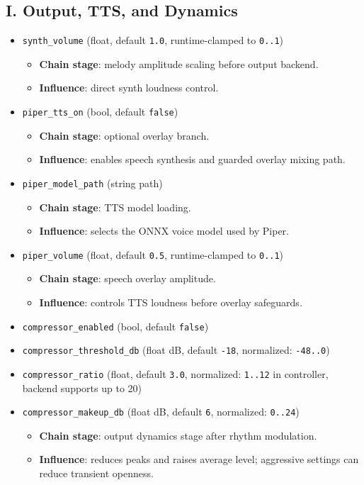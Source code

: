 \documentclass[11pt,a4paper]{article}
\begin{document}
\subsection*{I. Output, TTS, and Dynamics}
\begin{itemize}
  \item \texttt{synth\_volume} (float, default \texttt{1.0}, runtime-clamped to \texttt{0..1})
  \begin{itemize}
    \item \textbf{Chain stage}: melody amplitude scaling before output backend.
    \item \textbf{Influence}: direct synth loudness control.
  \end{itemize}

  \item \texttt{piper\_tts\_on} (bool, default \texttt{false})
  \begin{itemize}
    \item \textbf{Chain stage}: optional overlay branch.
    \item \textbf{Influence}: enables speech synthesis and guarded overlay mixing path.
  \end{itemize}

  \item \texttt{piper\_model\_path} (string path)
  \begin{itemize}
    \item \textbf{Chain stage}: TTS model loading.
    \item \textbf{Influence}: selects the ONNX voice model used by Piper.
  \end{itemize}

  \item \texttt{piper\_volume} (float, default \texttt{0.5}, runtime-clamped to \texttt{0..1})
  \begin{itemize}
    \item \textbf{Chain stage}: speech overlay amplitude.
    \item \textbf{Influence}: controls TTS loudness before overlay safeguards.
  \end{itemize}

  \item \texttt{compressor\_enabled} (bool, default \texttt{false})
  \item \texttt{compressor\_threshold\_db} (float dB, default \texttt{-18}, normalized: \texttt{-48..0})
  \item \texttt{compressor\_ratio} (float, default \texttt{3.0}, normalized: \texttt{1..12} in controller, backend supports up to 20)
  \item \texttt{compressor\_makeup\_db} (float dB, default \texttt{6}, normalized: \texttt{0..24})
  \begin{itemize}
    \item \textbf{Chain stage}: output dynamics stage after rhythm modulation.
    \item \textbf{Influence}: reduces peaks and raises average level; aggressive settings can reduce transient openness.
  \end{itemize}


\end{itemize}
\end{document}
